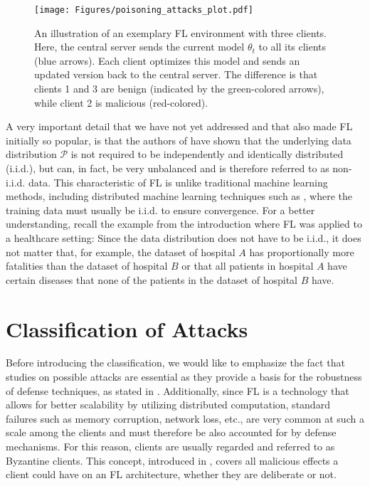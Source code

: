 \documentclass[conference]{IEEEtran}
\begin{document}
\begin{figure}
    \centering
    \texttt{[image: Figures/poisoning\_attacks\_plot.pdf]}
    \caption[Caption for LOF]{An illustration of an exemplary FL environment with three clients. Here, the central server sends the current model $\theta_{t}$ to all its clients (blue arrows). Each client optimizes this model and sends an updated version back to the central server. The difference is that clients 1 and 3 are benign (indicated by the green-colored arrows), while client 2 is malicious (red-colored).\footnotemark}
    \label{fig:example}
\end{figure}

A very important detail that we have not yet addressed and that also made FL initially so popular, is that the authors of \cite{McMahan2017} have shown that the underlying data distribution $\mathcal{P}$ is not required to be independently and identically distributed (i.i.d.), but can, in fact, be very unbalanced and is therefore referred to as non-i.i.d. data. This characteristic of FL is unlike traditional machine learning methods, including distributed machine learning techniques such as \cite{McDonald2010,Zhang2015,Povey2015}, where the training data must usually be i.i.d. to ensure convergence. For a better understanding, recall the example from the introduction where FL was applied to a healthcare setting: Since the data distribution does not have to be i.i.d., it does not matter that, for example, the dataset of hospital $A$ has proportionally more fatalities than the dataset of hospital $B$ or that all patients in hospital $A$ have certain diseases that none of the patients in the dataset of hospital $B$ have.

\section{Classification of Attacks}\label{sec:classification}
Before introducing the classification, we would like to emphasize the fact that studies on possible attacks are essential as they provide a basis for the robustness of defense techniques, as stated in \cite{Zhu2020}. Additionally, since FL is a technology that allows for better scalability by utilizing distributed computation, standard failures such as memory corruption, network loss, etc., are very common at such a scale among the clients and must therefore be also accounted for by defense mechanisms. For this reason, clients are usually regarded and referred to as Byzantine clients. This concept, introduced in \cite{Lamport1982}, covers all malicious effects a client could have on an FL architecture, whether they are deliberate or not.
\end{document}
